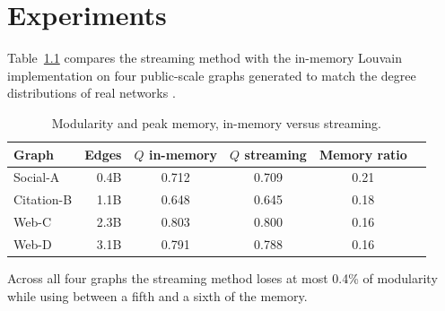 \chapter{Experiments}
\label{ch:experiments}

Table~\ref{tab:graphs} compares the streaming method with the in-memory Louvain implementation
on four public-scale graphs generated to match the degree distributions of real networks
\citep{leskovec2005}.

\begin{table}[htbp]
  \centering
  \caption{Modularity and peak memory, in-memory versus streaming.}
  \label{tab:graphs}
  \begin{tabular}{lrcccc}
    \toprule
    Graph & Edges & $Q$ in-memory & $Q$ streaming & Memory ratio \\
    \midrule
    Social-A   & 0.4B & 0.712 & 0.709 & 0.21 \\
    Citation-B & 1.1B & 0.648 & 0.645 & 0.18 \\
    Web-C      & 2.3B & 0.803 & 0.800 & 0.16 \\
    Web-D      & 3.1B & 0.791 & 0.788 & 0.16 \\
    \bottomrule
  \end{tabular}
\end{table}

Across all four graphs the streaming method loses at most 0.4\% of modularity while using
between a fifth and a sixth of the memory.

